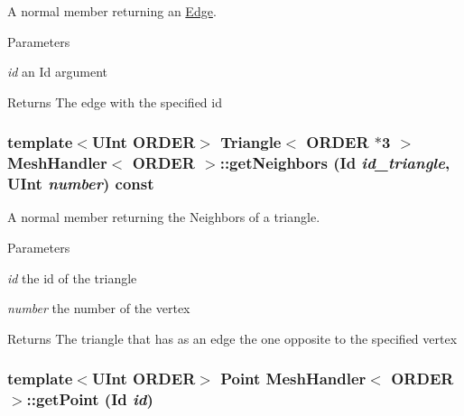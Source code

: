 A normal member returning an \hyperlink{classEdge}{Edge}. 
\begin{DoxyParams}{Parameters}
\item[{\em id}]an Id argument \end{DoxyParams}
\begin{DoxyReturn}{Returns}
The edge with the specified id 
\end{DoxyReturn}
\hypertarget{classMeshHandler_a67e2b3d75d30094f0a5a8d72213bdca3}{
\subsubsection[{getNeighbors}]{\setlength{\rightskip}{0pt plus 5cm}template$<$UInt ORDER$>$ {\bf Triangle}$<$ ORDER $\ast$3 $>$ {\bf MeshHandler}$<$ ORDER $>$::getNeighbors (Id {\em id\_\-triangle}, \/  UInt {\em number}) const}}
\label{classMeshHandler_a67e2b3d75d30094f0a5a8d72213bdca3}


A normal member returning the Neighbors of a triangle. 
\begin{DoxyParams}{Parameters}
\item[{\em id}]the id of the triangle \item[{\em number}]the number of the vertex \end{DoxyParams}
\begin{DoxyReturn}{Returns}
The triangle that has as an edge the one opposite to the specified vertex 
\end{DoxyReturn}
\hypertarget{classMeshHandler_a5657ecd9b4774575759ba816156e1586}{
\subsubsection[{getPoint}]{\setlength{\rightskip}{0pt plus 5cm}template$<$UInt ORDER$>$ {\bf Point} {\bf MeshHandler}$<$ ORDER $>$::getPoint (Id {\em id})}}
\label{classMeshHandler_a5657ecd9b4774575759ba816156e1586}


